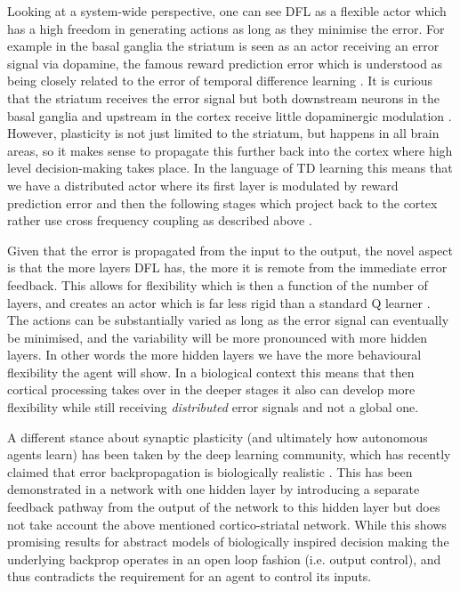 \documentclass{article}
\begin{document}
Looking at a system-wide perspective, one can see DFL as a flexible
actor which has a high freedom in generating actions as long as they
minimise the error. For example in the basal ganglia the striatum is
seen as an actor receiving an error signal via dopamine, the famous
reward prediction error \cite{Schultz97} which is understood as being
closely related to the error of temporal difference learning
\cite{gurney98:_basal_gangl_action_selec_devic}. It is curious that
the striatum receives the error signal but both downstream neurons in
the basal ganglia and upstream in the cortex receive little
dopaminergic modulation \cite{Beckstead1979}. However, plasticity is
not just limited to the striatum, but happens in all brain areas, so
it makes sense to propagate this further back into the cortex
\cite{Groenewegen1993} where high level decision-making takes place.
In the language of TD learning \cite{Sutton87} this means that we
have a distributed actor where its first layer is modulated by
reward prediction error and then the following stages which project
back to the cortex rather use cross frequency coupling
as described above \cite{Lipski2017}.

Given that the error is propagated from the input to the
output, the novel aspect is that the more layers DFL has, the more it
is remote from the immediate error feedback. This allows for
flexibility which is then a function of the number of layers, and
creates an actor which is far less rigid than a standard Q learner
\cite{Dayan1992}. The actions can be substantially varied as
long as the error signal can eventually be minimised, and the variability will be
more pronounced with more hidden layers. In other words the more
hidden layers we have the more behavioural flexibility the agent will
show. In a biological context this means that then cortical processing
takes over in the deeper stages it also can develop more flexibility
while still receiving \textsl{distributed} error signals and not
a global one.

A different stance about synaptic plasticity (and ultimately how
autonomous agents learn) has been taken by the deep learning
community, which has recently claimed that error backpropagation is
biologically realistic \cite{Lillicrap2016,Roelfsema2018}. This has
been demonstrated in a network with one hidden layer by introducing a
separate feedback pathway from the output of the network to this
hidden layer but does not take account the above mentioned
cortico-striatal network. While this shows promising results for
abstract models of biologically inspired decision making the underlying
backprop operates in an open loop fashion (i.e. output control), and thus
contradicts the requirement for an agent to control its inputs.
\end{document}
